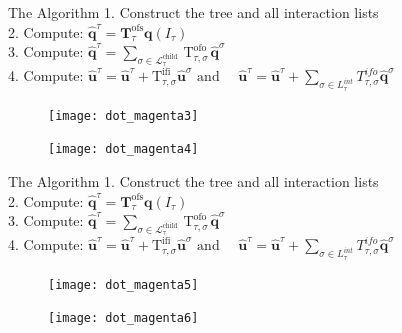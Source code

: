 \begin{frame}{The Algorithm}
  1. Construct the tree and all interaction lists\\
  \vspace{3mm}
  2. Compute: $\hat{\mathbf{q}}^{\tau}=\mathbf{T}_{\tau}^{\mathrm{ofs}} \mathbf{q}\left(I_{\tau}\right)$\\
  \vspace{3mm}
  3. Compute: $\hat{\mathbf{q}}^{\tau}=\sum_{\sigma \in \mathcal{L}_{\tau}^{\text {child }}} \mathrm{T}_{\tau, \sigma}^{\text {ofo }} \hat{\mathbf{q}}^{\sigma}$\\
  \vspace{3mm}
  4. Compute: $\hat{\mathbf{u}}^{\tau}=\hat{\mathbf{u}}^{\tau}+\mathrm{T}_{\tau, \sigma}^{\mathrm{ifi}} \hat{\mathbf{u}}^{\sigma} \text { and } \quad \hat{\boldsymbol{u}}^{\tau}=\hat{\boldsymbol{u}}^{\tau}+\sum_{\sigma \in L_{\tau}^{i n t}} T_{\tau, \sigma}^{i f o} \widehat{\boldsymbol{q}}^{\sigma}$\\
  \vspace{3mm}
  \begin{figure}[!tbp]
    \centering
    \begin{minipage}[b]{0.35\textwidth}
      \texttt{[image: dot\_magenta3]}
    \end{minipage}
    \hfill
    \begin{minipage}[b]{0.35\textwidth}
      \texttt{[image: dot\_magenta4]}
    \end{minipage}
  \end{figure}
\end{frame}

\begin{frame}{The Algorithm}
  1. Construct the tree and all interaction lists\\
  \vspace{3mm}
  2. Compute: $\hat{\mathbf{q}}^{\tau}=\mathbf{T}_{\tau}^{\mathrm{ofs}} \mathbf{q}\left(I_{\tau}\right)$\\
  \vspace{3mm}
  3. Compute: $\hat{\mathbf{q}}^{\tau}=\sum_{\sigma \in \mathcal{L}_{\tau}^{\text {child }}} \mathrm{T}_{\tau, \sigma}^{\text {ofo }} \hat{\mathbf{q}}^{\sigma}$\\
  \vspace{3mm}
  4. Compute: $\hat{\mathbf{u}}^{\tau}=\hat{\mathbf{u}}^{\tau}+\mathrm{T}_{\tau, \sigma}^{\mathrm{ifi}} \hat{\mathbf{u}}^{\sigma} \text { and } \quad \hat{\boldsymbol{u}}^{\tau}=\hat{\boldsymbol{u}}^{\tau}+\sum_{\sigma \in L_{\tau}^{i n t}} T_{\tau, \sigma}^{i f o} \widehat{\boldsymbol{q}}^{\sigma}$\\
  \vspace{3mm}
  \begin{figure}[!tbp]
    \centering
    \begin{minipage}[b]{0.35\textwidth}
      \texttt{[image: dot\_magenta5]}
    \end{minipage}
    \hfill
    \begin{minipage}[b]{0.35\textwidth}
      \texttt{[image: dot\_magenta6]}
    \end{minipage}
  \end{figure}
\end{frame}


